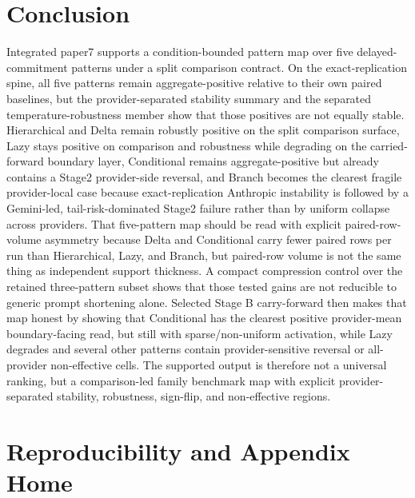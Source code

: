 \documentclass[11pt,a4paper]{article}
\begin{document}
\section{Conclusion}
\label{sec:conclusion}

Integrated paper7 supports a condition-bounded pattern map over five delayed-commitment patterns under a split comparison contract. On the exact-replication spine, all five patterns remain aggregate-positive relative to their own paired baselines, but the provider-separated stability summary and the separated temperature-robustness member show that those positives are not equally stable. Hierarchical and Delta remain robustly positive on the split comparison surface, Lazy stays positive on comparison and robustness while degrading on the carried-forward boundary layer, Conditional remains aggregate-positive but already contains a Stage2 provider-side reversal, and Branch becomes the clearest fragile provider-local case because exact-replication Anthropic instability is followed by a Gemini-led, tail-risk-dominated Stage2 failure rather than by uniform collapse across providers. That five-pattern map should be read with explicit paired-row-volume asymmetry because Delta and Conditional carry fewer paired rows per run than Hierarchical, Lazy, and Branch, but paired-row volume is not the same thing as independent support thickness. A compact compression control over the retained three-pattern subset shows that those tested gains are not reducible to generic prompt shortening alone. Selected Stage B carry-forward then makes that map honest by showing that Conditional has the clearest positive provider-mean boundary-facing read, but still with sparse/non-uniform activation, while Lazy degrades and several other patterns contain provider-sensitive reversal or all-provider non-effective cells. The supported output is therefore not a universal ranking, but a comparison-led family benchmark map with explicit provider-separated stability, robustness, sign-flip, and non-effective regions.

\section{Reproducibility and Appendix Home}
\label{sec:repro}
\end{document}
